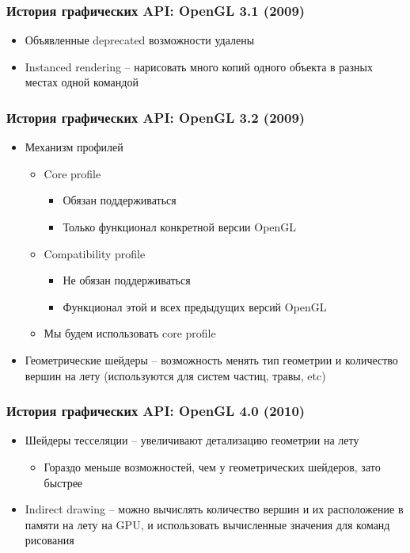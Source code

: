 \documentclass{beamer}
\begin{document}
\begin{frame}
\frametitle{История графических API: OpenGL 3.1 (2009)}
\begin{itemize}
\item Объявленные deprecated возможности удалены
\pause
\item Instanced rendering -- нарисовать много копий одного объекта в разных местах одной командой
\end{itemize}
\end{frame}

\begin{frame}
\frametitle{История графических API: OpenGL 3.2 (2009)}
\begin{itemize}
\item Механизм профилей
\begin{itemize}
\item Core profile
\begin{itemize}
\item Обязан поддерживаться
\item Только функционал конкретной версии OpenGL
\end{itemize}
\item Compatibility profile
\begin{itemize}
\item Не обязан поддерживаться
\item Функционал этой и всех предыдущих версий OpenGL
\end{itemize}
\pause
\item Мы будем использовать core profile
\end{itemize}
\pause
\item Геометрические шейдеры -- возможность менять тип геометрии и количество вершин на лету (используются для систем частиц, травы, etc)
\end{itemize}
\end{frame}

\begin{frame}
\frametitle{История графических API: OpenGL 4.0 (2010)}
\begin{itemize}
\item Шейдеры тесселяции -- увеличивают детализацию геометрии на лету
\begin{itemize}
\item Гораздо меньше возможностей, чем у геометрических шейдеров, зато быстрее
\end{itemize}
\pause
\item Indirect drawing -- можно вычислять количество вершин и их расположение в памяти на лету на GPU, и использовать вычисленные значения для команд рисования
\end{itemize}
\end{frame}
\end{document}
